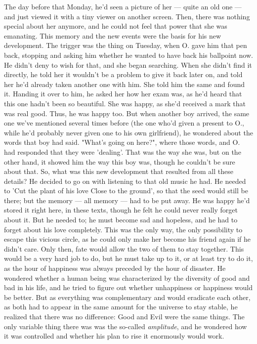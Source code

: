 The day before that Monday, he'd seen a picture of her --- quite an old one --- and just viewed it with a tiny viewer on another screen. Then, there was nothing special about her anymore, and he could not feel that power that she was emanating. 
This memory and the new events were the basis for his new development. The trigger was the thing on Tuesday, when O. gave him that pen back, stopping and asking him whether he wanted to have back his ballpoint now. He didn't deny to wish for that, and she began searching. When she didn't find it directly, he told her it wouldn't be a problem to give it back later on, and told her he'd already taken another one with him. 
She told him the same and found it. Handing it over to him, he asked her how her exam was, as he'd heard that this one hadn't been so beautiful. She was happy, as she'd received a mark that was real good. 
Thus, he was happy too. But when another boy arrived, the same one we've mentioned several times before (the one who'd given a present to O., while he'd probably never given one to his own girlfriend), he wondered about the words that boy had said. "What's going on here?", where those words, and O. had responded that they were 'dealing'. 
That was the way she was, but on the other hand, it showed him the way this boy was, though he couldn't be sure about that. 
So, what was this new development that resulted from all these details?
He decided to go on with listening to that old music he had. He needed to 'Cut the plant of his love Close to the ground', so that the seed would still be there; but the memory --- all memory --- had to be put away. He was happy he'd stored it right here, in these texts, though he felt he could never really forget about it. But he needed to; he must become sad and hopeless, and he had to forget about his love completely. This was the only way, the only possibility to escape this vicious circle, as he could only make her become his friend again if he didn't care. Only then, fate would allow the two of them to stay together. 
This would be a very hard job to do, but he must take up to it, or at least try to do it, as the hour of happiness was always preceded by the hour of disaster. 
He wondered whether a human being was characterized by the diversity of good and bad in his life, and he tried to figure out whether unhappiness or happiness would be better. 
But as everything was complementary and would eradicate each other, as both had to appear in the same amount for the universe to stay stable, he realized that there was no difference: Good and Evil were the same things. The only variable thing there was was the so-called \emph{amplitude}, and he wondered how it was controlled and whether his plan to rise it enormously would work. 
